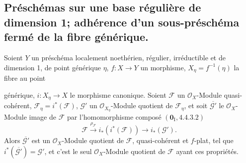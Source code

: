 \subsection{Préschémas sur une base régulière de dimension 1; adhérence d'un
sous-préschéma fermé de la fibre générique.}
\label{subsection:IV.2.8-fr}

\begin{proposition}[2.8.1]
\label{IV.2.8.1-fr}
Soient $Y$ un préschéma localement noethérien, régulier, irréductible et de
dimension 1, de point générique $\eta$, $f:X\to Y$ un morphisme,
$X_\eta=f^{-1}(\eta)$ la fibre au point

générique, $i:X_\eta\to X$ le morphisme canonique. Soient $\mathcal F$ un
$\mathcal O_X$-Module quasi-cohérent, $\mathcal F_\eta=i^*(\mathcal F)$,
$\mathcal G'$ un $\mathcal O_{X_\eta}$-Module quotient de $\mathcal F_\eta$,
et soit $\overline{\mathcal G'}$ le $\mathcal O_X$-Module image de $\mathcal F$
par l'homomorphisme composé $(\mathbf{0}_{\mathrm I},4.4.3.2)$
\[
\mathcal F\xrightarrow{\rho_{\mathcal F}}i_*(i^*(\mathcal F))
\longrightarrow i_*(\mathcal G').
\]
Alors $\overline{\mathcal G'}$ est un $\mathcal O_X$-Module quotient de
$\mathcal F$, quasi-cohérent et $f$-plat, tel que
$i^*(\overline{\mathcal G'})=\mathcal G'$, et c'est le seul
$\mathcal O_X$-Module quotient de $\mathcal F$ ayant ces propriétés.
\end{proposition}

